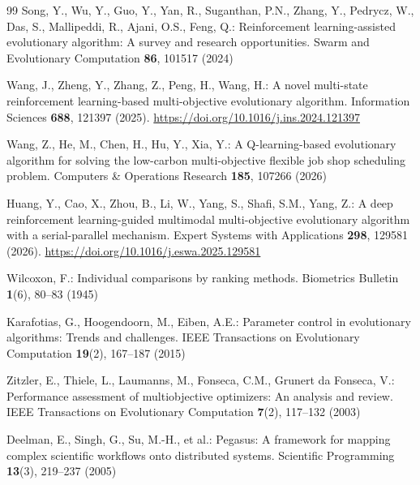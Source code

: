 \documentclass[preprint,12pt]{elsarticle}
\begin{document}
\begin{thebibliography}{99}
Song, Y., Wu, Y., Guo, Y., Yan, R., Suganthan, P.N., Zhang, Y., Pedrycz, W., Das, S., Mallipeddi, R., Ajani, O.S., Feng, Q.: Reinforcement learning-assisted evolutionary algorithm: A survey and research opportunities. Swarm and Evolutionary Computation \textbf{86}, 101517 (2024)

Wang, J., Zheng, Y., Zhang, Z., Peng, H., Wang, H.: A novel multi-state reinforcement learning-based multi-objective evolutionary algorithm. Information Sciences \textbf{688}, 121397 (2025). \url{https://doi.org/10.1016/j.ins.2024.121397}

Wang, Z., He, M., Chen, H., Hu, Y., Xia, Y.: A Q-learning-based evolutionary algorithm for solving the low-carbon multi-objective flexible job shop scheduling problem. Computers \& Operations Research \textbf{185}, 107266 (2026)

Huang, Y., Cao, X., Zhou, B., Li, W., Yang, S., Shafi, S.M., Yang, Z.: A deep reinforcement learning-guided multimodal multi-objective evolutionary algorithm with a serial-parallel mechanism. Expert Systems with Applications \textbf{298}, 129581 (2026). \url{https://doi.org/10.1016/j.eswa.2025.129581}

Wilcoxon, F.: Individual comparisons by ranking methods. Biometrics Bulletin \textbf{1}(6), 80--83 (1945)

Karafotias, G., Hoogendoorn, M., Eiben, A.E.: Parameter control in evolutionary algorithms: Trends and challenges. IEEE Transactions on Evolutionary Computation \textbf{19}(2), 167--187 (2015)

Zitzler, E., Thiele, L., Laumanns, M., Fonseca, C.M., Grunert da Fonseca, V.: Performance assessment of multiobjective optimizers: An analysis and review. IEEE Transactions on Evolutionary Computation \textbf{7}(2), 117--132 (2003)

Deelman, E., Singh, G., Su, M.-H., et al.: Pegasus: A framework for mapping complex scientific workflows onto distributed systems. Scientific Programming \textbf{13}(3), 219--237 (2005)


\end{thebibliography}
\end{document}
